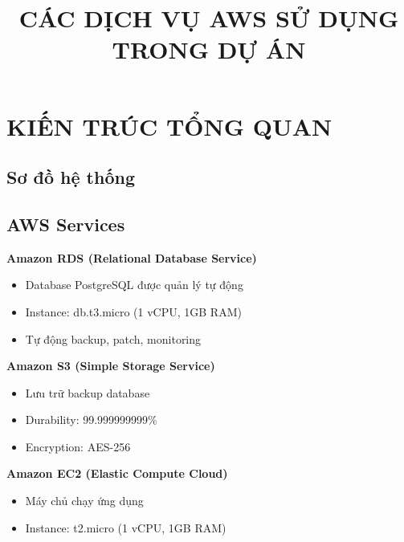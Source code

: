 \documentclass[12pt,a4paper]{article}
\title{\textbf{CÁC DỊCH VỤ AWS SỬ DỤNG TRONG DỰ ÁN}}
\author{}
\date{}
\begin{document}
\maketitle

\section{KIẾN TRÚC TỔNG QUAN}

\subsection{Sơ đồ hệ thống}

\begin{center}
\end{center}

\subsection{AWS Services}

\textbf{Amazon RDS (Relational Database Service)}
\begin{itemize}
    \item Database PostgreSQL được quản lý tự động
    \item Instance: db.t3.micro (1 vCPU, 1GB RAM)
    \item Tự động backup, patch, monitoring
\end{itemize}

\textbf{Amazon S3 (Simple Storage Service)}
\begin{itemize}
    \item Lưu trữ backup database
    \item Durability: 99.999999999\%
    \item Encryption: AES-256
\end{itemize}

\textbf{Amazon EC2 (Elastic Compute Cloud)}
\begin{itemize}
    \item Máy chủ chạy ứng dụng
    \item Instance: t2.micro (1 vCPU, 1GB RAM)
\end{itemize}
\end{document}

